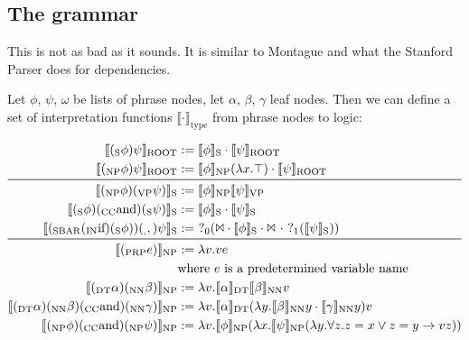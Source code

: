 \documentclass[12pt]{article}
\begin{document}
\subsection{The grammar}
This is not as bad as it sounds. It is similar to Montague and what the Stanford Parser does for dependencies.

Let $\phi$, $\psi$, $\omega$ be lists of phrase nodes, let $\alpha$, $\beta$, $\gamma$ leaf nodes.
Then we can define a set of interpretation functions $\llbracket\cdot\rrbracket_\text{type}$ from phrase nodes to logic:

\begin{equation*}\begin{aligned}
\ \llbracket (_\text{S}\phi)\psi\rrbracket_\text{ROOT} &:= \llbracket \phi\rrbracket_\text{S}\cdot\llbracket \psi\rrbracket_\text{ROOT}\\
\llbracket (_\text{NP}\phi)\psi\rrbracket_\text{ROOT} &:= \llbracket \phi\rrbracket_\text{NP}(\lambda x.\top)\cdot\llbracket \psi\rrbracket_\text{ROOT}\\
\midrule\ 
%
\llbracket (_\text{NP}\phi) (_\text{VP}\psi)\rrbracket_\text{S} &:= \llbracket \phi\rrbracket_\text{NP} \llbracket \psi\rrbracket_\text{VP}\\
\llbracket (_\text{S}\phi) (_\text{CC}\text{and}) (_\text{S}\psi)\rrbracket_\text{S} &:= \llbracket \phi\rrbracket_\text{S} \cdot \llbracket \psi\rrbracket_\text{S}\\
\llbracket (_\text{SBAR}(_\text{IN}\text{if})(_\text{S}\phi))(_\text{,},)\psi\rrbracket_\text{S} &:=\ ?_0(\Bowtie\cdot \llbracket \phi\rrbracket_\text{S}\cdot\Bowtie\ \cdot\ ?_1(\llbracket \psi\rrbracket_\text{S}))\\
\midrule\ 
%
\llbracket (_\text{PRP}e)\rrbracket_\text{NP} &:= \lambda v . ve\\
&\text{where $e$ is a predetermined variable name}\\
\llbracket (_\text{DT}\alpha) (_\text{NN}\beta)\rrbracket_\text{NP} &:= \lambda v . \llbracket \alpha\rrbracket_\text{DT} \llbracket \beta\rrbracket_\text{NN} v\\
\llbracket (_\text{DT}\alpha) (_\text{NN}\beta) (_\text{CC}\text{and}) (_\text{NN}\gamma)\rrbracket_\text{NP} &:= \lambda v . \llbracket \alpha\rrbracket_\text{DT} (\lambda y. \llbracket \beta\rrbracket_\text{NN}y \cdot \llbracket \gamma\rrbracket_\text{NN}y) v\\
\llbracket (_\text{NP}\phi) (_\text{CC}\text{and}) (_\text{NP}\psi)\rrbracket_\text{NP} &:= \lambda v.\llbracket \phi\rrbracket_\text{NP}(\lambda x.\llbracket \psi\rrbracket_\text{NP}(\lambda y.\forall z.z=x \vee z=y \rightarrow vz))\\

\end{aligned}
\end{equation*}
\end{document}
